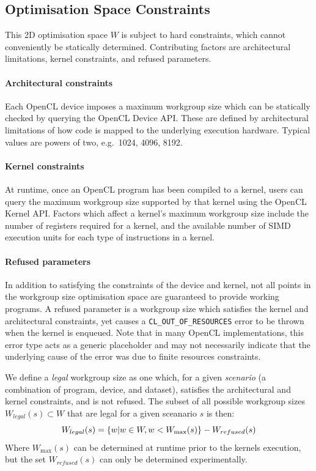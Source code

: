 \documentclass[nonatbib,preprint,10pt]{sigplanconf}
\begin{document}
\subsection{Optimisation Space Constraints}

This 2D optimisation space $W$ is subject to hard constraints, which
cannot conveniently be statically determined. Contributing factors are
architectural limitations, kernel constraints, and refused parameters.


\paragraph{Architectural constraints} Each OpenCL device imposes a
maximum workgroup size which can be statically checked by querying the
OpenCL Device API. These are defined by architectural limitations of
how code is mapped to the underlying execution hardware. Typical
values are powers of two, e.g.\ 1024, 4096, 8192.


\paragraph{Kernel constraints} At runtime, once an OpenCL program has
been compiled to a kernel, users can query the maximum workgroup size
supported by that kernel using the OpenCL Kernel API. Factors which
affect a kernel's maximum workgroup size include the number of
registers required for a kernel, and the available number of SIMD
execution units for each type of instructions in a kernel.


\paragraph{Refused parameters} In addition to satisfying the
constraints of the device and kernel, not all points in the workgroup
size optimisation space are guaranteed to provide working programs. A
refused parameter is a workgroup size which satisfies the kernel and
architectural constraints, yet causes a
\texttt{CL\_OUT\_OF\_RESOURCES} error to be thrown when the kernel is
enqueued. Note that in many OpenCL implementations, this error type
acts as a generic placeholder and may not necessarily indicate that
the underlying cause of the error was due to finite resources
constraints.


We define a \emph{legal} workgroup size as one which, for a given
\emph{scenario} (a combination of program, device, and dataset),
satisfies the architectural and kernel constraints, and is not
refused. The subset of all possible workgroup sizes
$W_{legal}(s) \subset W$ that are legal for a given sceanario $s$ is
then:
%
\begin{equation}
  \footnotesize
  W_{legal}(s) = \left\{w | w \in W, w < W_{\max}(s) \right\} - W_{refused}(s)
\end{equation}
%
Where $W_{\max}(s)$ can be determined at runtime prior to the kernels
execution, but the set $W_{refused}(s)$ can only be determined
experimentally.
\end{document}
